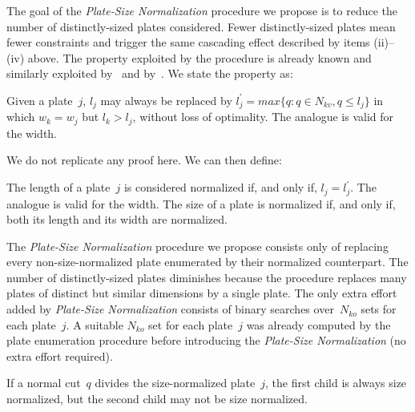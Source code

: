 \documentclass[smallextended]{svjour3}       %
\begin{document}
The goal of the \emph{Plate-Size Normalization} procedure we propose is to reduce the number of distinctly-sized plates considered.
Fewer distinctly-sized plates mean fewer constraints and trigger the same cascading effect described by items (ii)--(iv) above.
The property exploited by the procedure is already known and similarly exploited by~\cite{alvarez:2009} and by~\cite{dolatabadi:2012}.
We state the property as:

\begin{proposition}
\label{pro:normalization}
Given a plate~\(j\), \(l_j\) may always be replaced by \(l^\prime_j = max\{q : q \in N_{kv}, q \leq l_j\}\) in which \(w_k = w_j\) but \(l_k > l_j\), without loss of optimality.
The analogue is valid for the width.
\end{proposition}

We do not replicate any proof here. We can then define: 

\begin{definition}
The length of a plate~\(j\) is considered normalized if, and only if, \(l_j = l^\prime_j\).
The analogue is valid for the width.
The size of a plate is normalized if, and only if, both its length and its width are normalized.
\end{definition}

The \emph{Plate-Size Normalization} procedure we propose consists only of replacing every non-size-normalized plate enumerated by their normalized counterpart.
The number of distinctly-sized plates diminishes because the procedure replaces many plates of distinct but similar dimensions by a single plate.
The only extra effort added by \emph{Plate-Size Normalization} consists of binary searches over~\(N_{ko}\) sets for each plate~\(j\).
A suitable \(N_{ko}\) set for each plate~\(j\) was already computed by the plate enumeration procedure before introducing the \emph{Plate-Size Normalization} (no extra effort required).

\begin{remark}
If a normal cut~\(q\) divides the size-normalized plate~\(j\), the first child is always size normalized, but the second child may not be size normalized.
\end{remark}

\end{document}
